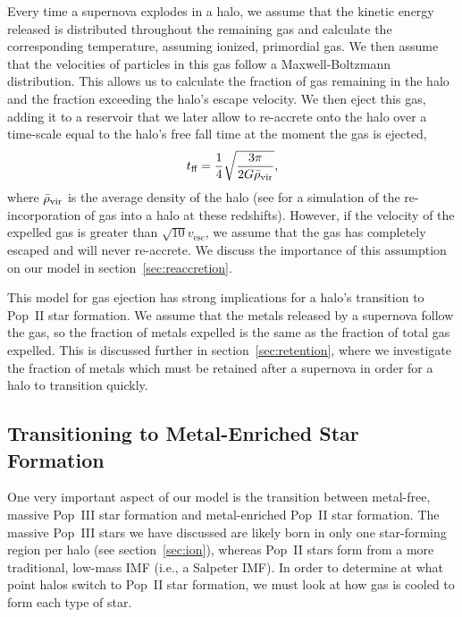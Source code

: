 \documentclass[a4paper,fleqn,usenatbib]{mnras}
\begin{document}
Every time a supernova explodes in a halo, we assume that the kinetic energy released is distributed throughout the remaining gas and calculate 
the corresponding temperature, assuming ionized, primordial gas. We then assume that the velocities of particles in this gas follow a Maxwell-Boltzmann distribution. 
This allows us to calculate the fraction of gas remaining in the halo and the fraction exceeding the halo's escape velocity. 
We then eject this gas, adding it to a reservoir that we later allow to re-accrete onto the halo over a time-scale equal to the halo's free fall time at the moment the gas is ejected,
\begin{equation}
t_{\text{ff}} = \frac{1}{4} \sqrt{\frac{3\pi}{2G\bar{\rho}_{\rm vir}}},
\end{equation}
where $\bar{\rho}_{\rm vir}$ is the average density of the halo (see \citealt{yoshida_2007} for a simulation of the re-incorporation of gas into a halo at these redshifts). 
However, if the velocity of the expelled gas is greater than $\sqrt{10} v_\text{esc}$, we assume that the gas has completely escaped and will never re-accrete. We discuss the importance of this assumption on our model in section~\ref{sec:reaccretion}.

This model for gas ejection has 
strong implications for a halo's transition to Pop~II star formation. We assume that the metals released by a supernova follow the gas, so the fraction of metals expelled is the same as the fraction of total gas expelled. This is discussed further in section~\ref{sec:retention}, where we investigate the fraction of metals which must be retained after a supernova in order for a halo to transition quickly.

\subsection{Transitioning to Metal-Enriched Star Formation}
\label{sec:trans}

One very important aspect of our model is the transition between metal-free, massive Pop~III star formation and metal-enriched Pop~II star formation.  The massive Pop~III stars we have discussed are likely born in only one star-forming region per halo (see section~\ref{sec:ion}), whereas Pop~II stars form from a more traditional, low-mass IMF (i.e., a Salpeter IMF).  In order to determine at what point halos switch to Pop~II star formation, we must look at how gas is cooled to form each type of star.  
\end{document}
